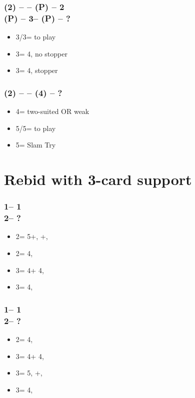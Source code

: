 \subsubsection*{(2\spades) -- \dbl -- (P) -- 2\nt \\
                (P) -- 3\mins -- (P) -- ?}
\begin{itemize}
    \item 3\hearts/3\diams = to play
    \item 3\spades = 4\hearts, no \spades stopper
    \item 3\nt = 4\hearts, \spades stopper
\end{itemize}

\subsubsection*{(2\spades) -- \dbl -- (4\spades) -- ?}
\begin{itemize}
    \item 4\nt = two-suited OR weak \hearts
    \item 5\clubs/5\diams = to play
    \item 5\hearts = Slam Try
\end{itemize}

\section{\texorpdfstring{Rebid with 3-card support}{rebid3card}}\label{sec:rebid3card}

\subsubsection*{1\clubs -- 1\hearts \\ 2\hearts -- ?}
\begin{itemize}
    \item 2\spades = 5+\hearts, \inv+, \lsf
    \item 2\nt = 4\hearts, \inv
    \item 3\clubs = 4\hearts + 4\clubs, \inv
    \item 3\diams = 4\hearts, \gf
\end{itemize}

\subsubsection*{1\clubs -- 1\spades \\ 2\spades -- ?}
\begin{itemize}
    \item 2\nt = 4\spades, \inv
    \item 3\clubs = 4\spades + 4\clubs, \inv
    \item 3\diams = 5\spades, \inv+, \lsf
    \item 3\hearts = 4\spades, \gf
\end{itemize}

